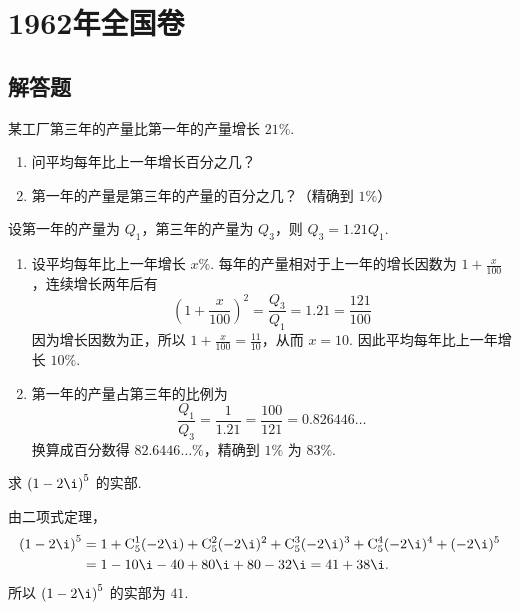 \chapter{1962年全国卷}

\section{解答题}

\begin{problem}
某工厂第三年的产量比第一年的产量增长 \(21\%\).

\begin{enumerate}
\item 问平均每年比上一年增长百分之几？
\item 第一年的产量是第三年的产量的百分之几？（精确到 \(1\%\)）
\end{enumerate}
\end{problem}

\begin{solution}
设第一年的产量为 \(Q_1\)，第三年的产量为 \(Q_3\)，则 \(Q_3=1.21Q_1\).

\begin{enumerate}
\item 设平均每年比上一年增长 \(x\%\). 每年的产量相对于上一年的增长因数为 \(1+\frac{x}{100}\)，连续增长两年后有
\[
\left(1+\frac{x}{100}\right)^2=\frac{Q_3}{Q_1}=1.21=\frac{121}{100}
\]
因为增长因数为正，所以 \(1+\frac{x}{100}=\frac{11}{10}\)，从而 \(x=10\). 因此平均每年比上一年增长 \(10\%\).

\item 第一年的产量占第三年的比例为
\[
\frac{Q_1}{Q_3}=\frac{1}{1.21}=\frac{100}{121}=0.826446\ldots
\]
换算成百分数得 \(82.6446\ldots\%\)，精确到 \(1\%\) 为 \(83\%\).
\end{enumerate}
\end{solution}

\begin{problem}
求 \(\left(1-2\i\right)^5\) 的实部.
\end{problem}

\begin{solution}
由二项式定理，
\[
\begin{aligned}
\left(1-2\i\right)^5
&=1+\mathrm C_5^1(-2\i)+\mathrm C_5^2(-2\i)^2+\mathrm C_5^3(-2\i)^3+\mathrm C_5^4(-2\i)^4+(-2\i)^5\\
&=1-10\i-40+80\i+80-32\i=41+38\i.
\end{aligned}
\]
所以 \(\left(1-2\i\right)^5\) 的实部为 \(41\).
\end{solution}

